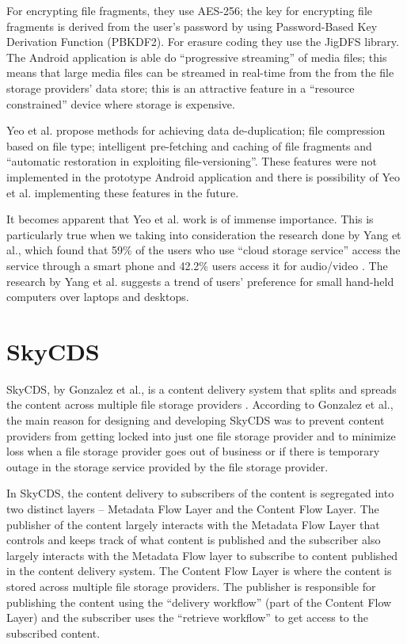For encrypting file fragments, they use AES-256; the key for
encrypting file fragments is derived from the user's password by using
Password-Based Key Derivation Function (PBKDF2)\cite{kaliski}. For
erasure coding they use the JigDFS library\cite{jigdfs}. The Android
application is able do ``progressive streaming'' of media files; this
means that large media files can be streamed in real-time from the
from the file storage providers' data store; this is an attractive
feature in a ``resource constrained'' device where storage is
expensive.

Yeo et al. propose methods for achieving data de-duplication; file
compression based on file type; intelligent pre-fetching
and caching of file fragments and ``automatic restoration in
exploiting file-versioning''. These features were not implemented in
the prototype Android application and there is possibility of Yeo et
al. implementing these features in the future.

It becomes apparent that Yeo et al. work is of immense importance. This is particularly true when
we taking into consideration the research done by Yang et al., which
found that 59\% of the users who use ``cloud storage service'' access
the service through a smart phone and 42.2\% users access it for
audio/video \cite{yang}. The research by Yang et al. 
suggests a trend of users' preference for small hand-held computers
over laptops and desktops.

\section{SkyCDS}\label{2-skycds-sec}

SkyCDS, by Gonzalez et al., is a content delivery system that splits
and spreads the content across multiple file storage
providers \cite{skycds}. According to Gonzalez et al., the main reason
for designing and developing SkyCDS was to prevent content providers
from getting locked into just one file storage provider and to
minimize loss when a file storage provider goes out of business or if
there is temporary outage in the storage service provided by the file
storage provider.

In SkyCDS, the content delivery to subscribers of the content is
segregated into two distinct layers -- Metadata Flow Layer and the
Content Flow Layer. The publisher of the content largely interacts
with the Metadata Flow Layer that controls and keeps track of what
content is published and the subscriber also largely interacts with
the Metadata Flow layer to subscribe to content published in the
content delivery system. The Content Flow Layer is where the content
is stored across multiple file storage providers. The publisher is
responsible for publishing the content using the ``delivery workflow''
(part of the Content Flow Layer) and the subscriber uses the
``retrieve workflow'' to get access to the subscribed content.

